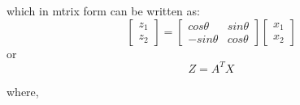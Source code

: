 \documentclass[12pt,a4paper]{report}
\begin{document}
which in mtrix form can be written as: 
\begin{equation}
\begin{bmatrix}
    z_{1} \\
    z_{2}
\end{bmatrix}
=
\begin{bmatrix}
    cos \theta & sin \theta \\
    - sin \theta & cos \theta
\end{bmatrix}
\begin{bmatrix}
    x_{1} \\
    x_{2}
\end{bmatrix}
\end{equation}
or
\begin{equation}
Z =  A^T X
\end{equation}

where,
\end{document}
